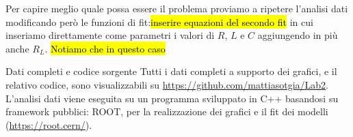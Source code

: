 \documentclass[
    rmp,
    floatfix,
    reprint, 
    superscriptaddress, 
    altaffilletter, 
    amsmath, 
    amssymb, 
    a4paper]{revtex4-2}
\begin{document}
Per capire meglio quale possa essere il problema proviamo a ripetere l'analisi dati modificando però le funzioni di fit:\hl{inserire equazioni del secondo fit} in cui inseriamo direttamente come parametri i valori di $R$, $L$ e $C$ aggiungendo in più anche $R_L$. \hl{Notiamo che in questo caso}





\begin{methods}{D\lowercase{ati completi e codice sorgente}}
    Tutti i dati completi a supporto dei grafici, e il relativo codice, sono visualizzabili su \url{https://github.com/mattiasotgia/Lab2}. L'analisi dati viene eseguita su un programma sviluppato in C++ basandosi su framework pubblici: ROOT, per la realizzazione dei grafici e il fit dei modelli (\url{https://root.cern/}).
\end{methods}


\appendix

\renewcommand{\thetable}{S-\arabic{table}}

\end{document}
